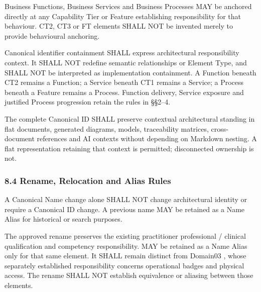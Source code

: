 Business Functions, Business Services and Business Processes MAY be anchored directly at any Capability Tier or Feature establishing responsibility for that behaviour. CT2, CT3 or FT elements SHALL NOT be invented merely to provide behavioural anchoring.

\label{rad:metamodel:389}

Canonical identifier containment SHALL express architectural responsibility context. It SHALL NOT redefine semantic relationships or Element Type, and SHALL NOT be interpreted as implementation containment. A Function beneath CT2 remains a Function; a Service beneath CT1 remains a Service; a Process beneath a Feature remains a Process. Function delivery, Service exposure and justified Process progression retain the rules in §§2–4.

\label{rad:metamodel:391}

The complete Canonical ID SHALL preserve contextual architectural standing in flat documents, generated diagrams, models, traceability matrices, cross-document references and AI contexts without depending on Markdown nesting. A flat representation retaining that context is permitted; disconnected ownership is not.

\label{rad:metamodel:393}
\subsubsection*{8.4 Rename, Relocation and Alias Rules}
\label{rad:metamodel:395}

A Canonical Name change alone SHALL NOT change architectural identity or require a Canonical ID change. A previous name MAY be retained as a Name Alias for historical or search purposes.

\label{rad:metamodel:397}

The approved rename \texttt{} preserves the existing practitioner professional /\allowbreak{} clinical qualification and competency responsibility. \texttt{} MAY be retained as a Name Alias only for that same element. It SHALL remain distinct from Domain03 \texttt{}, whose separately established responsibility concerns operational badges and physical access. The rename SHALL NOT establish equivalence or aliasing between those elements.

\label{rad:metamodel:399}

